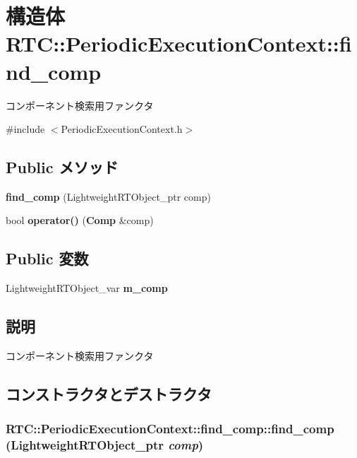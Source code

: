 \section{構造体 RTC::PeriodicExecutionContext::find\_\-comp}
\label{structRTC_1_1PeriodicExecutionContext_1_1find__comp}


コンポーネント検索用ファンクタ  




{\ttfamily \#include $<$PeriodicExecutionContext.h$>$}

\subsection*{Public メソッド}
\begin{DoxyCompactItemize}
\item 
{\bf find\_\-comp} (LightweightRTObject\_\-ptr comp)
\item 
bool {\bf operator()} ({\bf Comp} \&comp)
\end{DoxyCompactItemize}
\subsection*{Public 変数}
\begin{DoxyCompactItemize}
\item 
LightweightRTObject\_\-var {\bf m\_\-comp}
\end{DoxyCompactItemize}


\subsection{説明}
コンポーネント検索用ファンクタ 

\subsection{コンストラクタとデストラクタ}
\subsubsection[{find\_\-comp}]{\setlength{\rightskip}{0pt plus 5cm}RTC::PeriodicExecutionContext::find\_\-comp::find\_\-comp (LightweightRTObject\_\-ptr {\em comp})\hspace{0.3cm}{\ttfamily  [inline]}}\label{structRTC_1_1PeriodicExecutionContext_1_1find__comp_ad122d50fe656d3cfa2d0a32a6a05b950}


